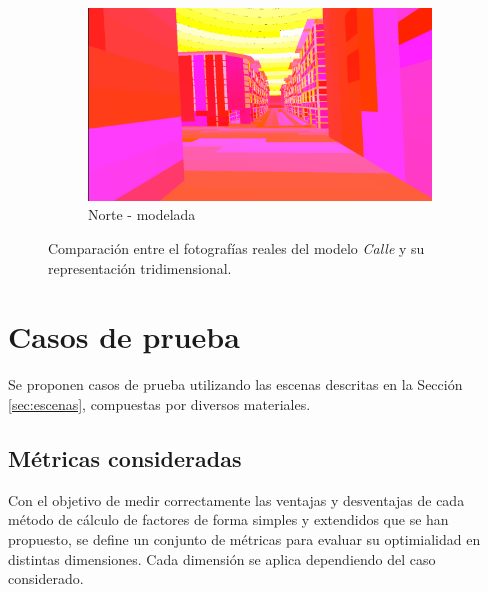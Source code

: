 \begin{figure}[htbp]
\begin{subfigure}{0.475\textwidth}
		\includegraphics[width=1\linewidth]{assets/streetmodel2}
		\caption{Norte - modelada}
	\end{subfigure}
	\caption{Comparación entre el fotografías reales del modelo \textit{Calle} y su representación tridimensional.}
	\label{img:streetcomp}
\end{figure}

\section{Casos de prueba}
\label{sec:pruebas}

Se proponen casos de prueba utilizando las escenas descritas en la Sección \ref{sec:escenas}, compuestas por diversos materiales.

\subsection{Métricas consideradas}
\label{metricasestablecidas}
Con el objetivo de medir correctamente las ventajas y desventajas de cada método de cálculo de factores de forma simples y extendidos que se han propuesto, se define un conjunto de métricas para evaluar su optimialidad en distintas dimensiones. Cada dimensión se aplica dependiendo del caso considerado.

